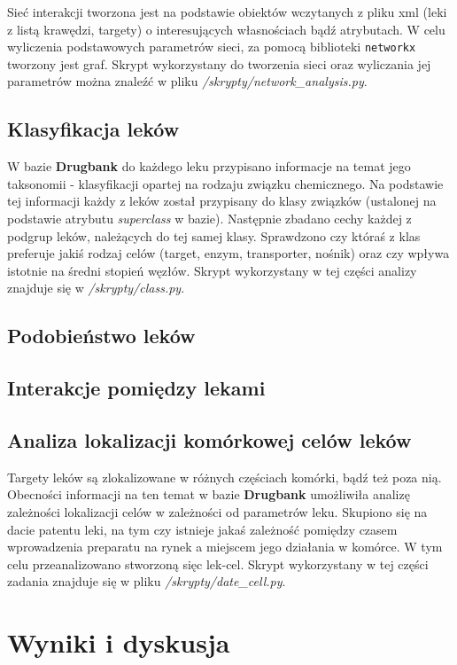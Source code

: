 \documentclass[11pt]{article}
\begin{document}
Sieć interakcji tworzona jest na podstawie obiektów wczytanych z pliku xml (leki z listą krawędzi, targety) o interesujących własnościach bądź atrybutach. W celu wyliczenia podstawowych parametrów sieci, za pomocą biblioteki \texttt{networkx} tworzony jest graf. Skrypt wykorzystany do tworzenia sieci oraz wyliczania jej parametrów można znaleźć w pliku \textit{/skrypty/network\_analysis.py}.

\subsection{Klasyfikacja leków}

W bazie \textbf{Drugbank} do każdego leku przypisano informacje na temat jego taksonomii - klasyfikacji opartej na rodzaju związku chemicznego. Na podstawie tej informacji każdy z leków został przypisany do klasy związków (ustalonej na podstawie atrybutu \textit{superclass} w bazie). Następnie zbadano cechy każdej z podgrup leków, należących do tej samej klasy. Sprawdzono czy któraś z klas preferuje jakiś rodzaj celów (target, enzym, transporter, nośnik) oraz czy wpływa istotnie na średni stopień węzłów. Skrypt wykorzystany w tej części analizy znajduje się w \textit{/skrypty/class.py}.

\subsection{Podobieństwo leków}

\subsection{Interakcje pomiędzy lekami}

\subsection{Analiza lokalizacji komórkowej celów leków}

Targety leków są zlokalizowane w różnych częściach komórki, bądź też poza nią. Obecności informacji na ten temat w bazie \textbf{Drugbank} umożliwiła analizę zależności lokalizacji celów w zależności od parametrów leku. Skupiono się na dacie patentu leki, na tym czy istnieje jakaś zależność pomiędzy czasem wprowadzenia preparatu na rynek a miejscem jego działania w komórce. W tym celu przeanalizowano stworzoną sięc lek-cel. Skrypt wykorzystany w tej części zadania znajduje się w pliku \textit{/skrypty/date\_cell.py}.

\section{Wyniki i dyskusja}
\end{document}
